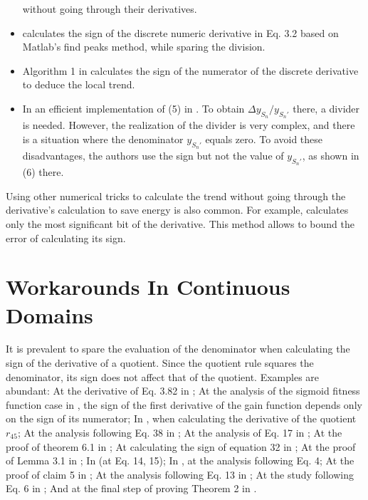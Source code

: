 \documentclass[11pt]{book}
\begin{document}
\begin{itemize}
without going through their derivatives.
\item \cite{cheng2018peak}
calculates the sign of the discrete numeric derivative in Eq. 3.2
based on Matlab's find peaks method, while sparing the division.
\item Algorithm 1 in \cite{huang2017robust}
calculates the sign of the numerator of the discrete derivative to
deduce the local trend.
\item In an efficient implementation of (5) in \cite{chen2020split}.
To obtain $\Delta y_{S_{n}}/y_{S_{n}'}$ there, a divider is needed.
However, the realization of the divider is very complex, and there
is a situation where the denominator $y_{S_{n}'}$ equals zero. To
avoid these disadvantages, the authors use the sign but not the value
of $y_{S_{n}'}$, as shown in (6) there.
\end{itemize}
Using other numerical tricks to calculate the trend without going
through the derivative's calculation to save energy is also common.
For example, \cite{wang2019e2}
calculates only the most significant bit of the derivative. This method
allows to bound the error of calculating its sign.

\section{Workarounds In Continuous Domains}
It is prevalent to spare the evaluation of the denominator when calculating
the sign of the derivative of a quotient. Since the quotient rule
squares the denominator, its sign does not affect that of the quotient.
Examples are abundant: At the derivative of Eq. 3.82 in \cite{xiao2017passivity};
At the analysis of the sigmoid fitness function case in \cite{gajer2009examining},
the sign of the first derivative of the gain function depends only
on the sign of its numerator; In \cite{shevkunov2011effect},
when calculating the derivative of the quotient $r_{45}$; At the
analysis following Eq. 38 in \cite{palley2019unemployment};
At the analysis of Eq. 17 in \cite{offiong2016determining};
At the proof of theorem 6.1 in \cite{van2017economic};
At calculating the sign of equation 32 in \cite{seno2020sis};
At the proof of Lemma 3.1 in \cite{bonettini2021variable};
In \cite{chen2017direct}
(at Eq. 14, 15); In \cite{sheremeta2021impact},
at the analysis following Eq. 4; At the proof of claim 5 in \cite{bell2018three};
At the analysis following Eq. 13 in \cite{silvar};
At the study following Eq. 6 in \cite{morel2005wood}; And at the final step of proving Theorem 2 in \cite[p.~38]{valavi2020time}.
\end{document}

